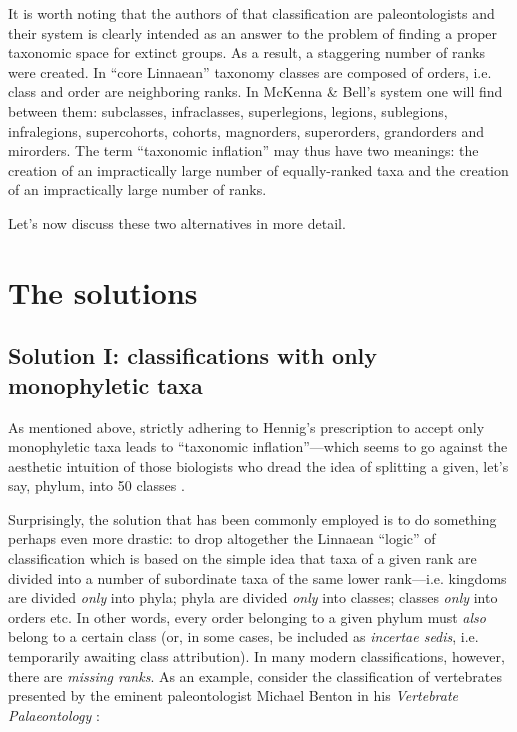 \begin{artengenv}
It is worth noting that the authors of that classification are paleontologists and their system is clearly intended as
an answer to the problem of finding a proper taxonomic space for extinct groups. As a result, a staggering number of
ranks were created. In ``core Linnaean'' taxonomy classes are composed of orders, i.e. class and order are neighboring
ranks. In McKenna \& Bell’s system one will find between them: subclasses, infraclasses, superlegions, legions,
sublegions, infralegions, supercohorts, cohorts, magnorders, superorders, grandorders and mirorders. The term
``taxonomic inflation'' may thus have two meanings: the creation of an impractically large number of equally-ranked taxa
and the creation of an impractically large number of ranks.

Let’s now discuss these two alternatives in more detail.

\section{The solutions}
\vspace*{-1cm}
\subsection{Solution I: classifications with only monophyletic taxa}

As mentioned above, strictly adhering to Hennig’s prescription to accept only monophyletic taxa leads to ``taxonomic
inflation''---which seems to go against the aesthetic intuition of those biologists who dread the idea of splitting a
given, let’s say, phylum, into 50 classes
\parencite{cavalier-smith_revised_1998}.

Surprisingly, the solution that has been commonly employed is to do something perhaps even more drastic: to drop
altogether the Linnaean ``logic'' of classification which is based on the simple idea that taxa of a given rank are
divided into a number of subordinate taxa of the same lower rank---i.e. kingdoms are divided \textit{only} into phyla;
phyla are divided \textit{only} into classes; classes \textit{only} into orders etc. In other words, every order
belonging to a given phylum must \textit{also }belong to a certain class (or, in some cases, be included as
\textit{incertae sedis}, i.e. temporarily awaiting class attribution). In many modern classifications, however, there
are \textit{missing ranks}. As an example, consider the classification of vertebrates presented by the eminent
paleontologist Michael Benton in his \textit{Vertebrate Palaeontology}
\parencite[p.433nn]{benton_vertebrate_2014}:


\end{artengenv}
